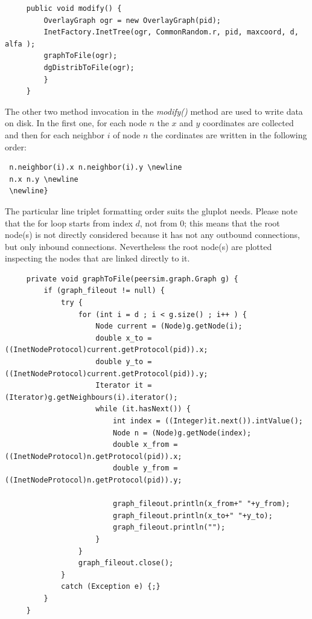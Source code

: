 \documentclass[a4paper,12pt]{article}
\begin{document}
\footnotesize 
\begin{verbatim}
     public void modify() {
         OverlayGraph ogr = new OverlayGraph(pid);
         InetFactory.InetTree(ogr, CommonRandom.r, pid, maxcoord, d, alfa );
         graphToFile(ogr);
         dgDistribToFile(ogr);
         }
     }
\end{verbatim}
\normalsize

 The other two method invocation in the \emph{modify()} method are 
used to write data on disk. In the first one, for each node $n$ the $x$ 
and $y$ coordinates are collected and then for each neighbor $i$ of node
$n$ the cordinates are written in the following order: 

\footnotesize
\begin{verbatim}
 n.neighbor(i).x n.neighbor(i).y \newline
 n.x n.y \newline
 \newline}
\end{verbatim}
\normalsize 

 The particular line triplet formatting order suits the gluplot needs. 
Please note that the for loop starts from index $d$, not from 0; this means 
that the root node(s) is not directly considered because it has not any 
outbound connections, but only inbound connections. Nevertheless the root 
node(s) are plotted inspecting the nodes that are linked directly to it.

\footnotesize
\begin{verbatim} 
     private void graphToFile(peersim.graph.Graph g) {
         if (graph_fileout != null) { 
             try {
                 for (int i = d ; i < g.size() ; i++ ) {
                     Node current = (Node)g.getNode(i);
                     double x_to = ((InetNodeProtocol)current.getProtocol(pid)).x;
                     double y_to = ((InetNodeProtocol)current.getProtocol(pid)).y;
                     Iterator it = (Iterator)g.getNeighbours(i).iterator();
                     while (it.hasNext()) {
                         int index = ((Integer)it.next()).intValue();
                         Node n = (Node)g.getNode(index);
                         double x_from = ((InetNodeProtocol)n.getProtocol(pid)).x;
                         double y_from = ((InetNodeProtocol)n.getProtocol(pid)).y;
                         
                         graph_fileout.println(x_from+" "+y_from);
                         graph_fileout.println(x_to+" "+y_to);
                         graph_fileout.println("");
                     }
                 }
                 graph_fileout.close();
             }
             catch (Exception e) {;}
         }
     }
\end{verbatim}
\normalsize
\end{document}
